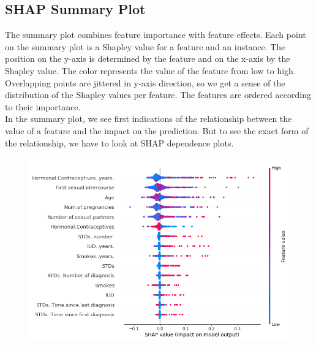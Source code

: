 \subsection{SHAP Summary Plot}
\centering
\begin{minipage}{0.40\textwidth}
    The summary plot combines feature importance with feature effects. Each point on the summary plot is a Shapley value for a feature and an instance. The position on the y-axis is determined by the feature and on the x-axis by the Shapley value. The color represents the value of the feature from low to high. Overlapping points are jittered in y-axis direction, so we get a sense of the distribution of the Shapley values per feature. The features are ordered according to their importance.\\

    In the summary plot, we see first indications of the relationship between the value of a feature and the impact on the prediction. But to see the exact form of the relationship, we have to look at SHAP dependence plots.
\end{minipage}
\hfill
\begin{minipage}{0.55\textwidth}
    \begin{figure}[H]
        \includegraphics[width=\textwidth]{img/shap-importance-extended.png}
        \centering
    \end{figure}
\end{minipage}

